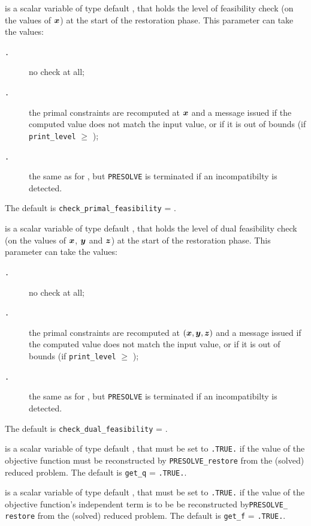 \documentclass{galahad}
\newcommand{\packagename}{PRESOLVE}
\newcommand{\sym}{\tt\small}
\begin{document}
\begin{description}
 is a scalar variable of type default
\integer, that holds the level of feasibility check (on the values of ${\bm{x}}$)
at the start of the restoration phase.  This parameter can
take the values:
\begin{description}
\item[\sym \galsymnone.] no check at all;
\item[\sym \galsymbasic.] the primal constraints are recomputed at ${\bm{x}}$
             and a message issued if the computed value
             does not match the input value, or if it is
             out of bounds (if {\tt print\_level} $\geq$ {\sym \galsymaction});
\item[\sym \galsymsevere.] the same as for {\sym \galsymbasic}, but {\tt \packagename} is
              terminated if an incompatibilty is detected.
\end{description}
The default is {\tt check\_primal\_feasibility} = {\sym \galsymnone}.

 is a scalar variable of type default
\integer, that holds the level of dual feasibility check (on the values of
${\bm{x}}$, ${\bm{y}}$ and ${\bm{z}}$) at the start of the restoration phase.  This
parameter can take the values:
\begin{description}
\item[\sym \galsymnone.] no check at all;
\item[\sym \galsymbasic.] the primal constraints are recomputed at $({\bm{x}},{\bm{y}},{\bm{z}})$
             and a message issued if the computed value
             does not match the input value, or if it is
             out of bounds (if {\tt print\_level} $\geq$ {\sym \galsymaction});
\item[\sym \galsymsevere.] the same as for {\sym \galsymbasic}, but {\tt \packagename} is
              terminated if an incompatibilty is detected.
\end{description}
The default is {\tt check\_dual\_feasibility} = {\sym \galsymnone}.

 is a scalar variable of type default \logical, that
must be set to {\tt .TRUE.} if the value of the objective
function must be reconstructed by {\tt \packagename\_restore} from the
(solved) reduced problem.
The default is {\tt get\_q} = {\tt .TRUE.}.

 is a scalar variable of type default \logical, that
must be set to {\tt .TRUE.} if the value of the objective
function's independent term is to be be reconstructed
by{\tt \packagename\_ restore} from the (solved) reduced problem.
The default is {\tt get\_f} = {\tt .TRUE.}.


\end{description}
\end{document}
